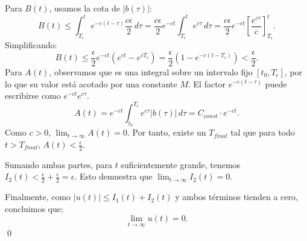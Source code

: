 {\begin{enumerate}
        Para $B(t)$, usamos la cota de $|b(\tau)|$:
        \[
        B(t) \leq \int_{T_\epsilon}^t e^{-c(t - \tau)} \frac{c\epsilon}{2} \, d\tau = \frac{c\epsilon}{2} e^{-ct} \int_{T_\epsilon}^t e^{c\tau} \, d\tau = \frac{c\epsilon}{2} e^{-ct} \left[ \frac{e^{c\tau}}{c} \right]_{T_\epsilon}^t.
        \]
        Simplificando:
        \[
        B(t) \leq \frac{\epsilon}{2} e^{-ct} (e^{ct} - e^{cT_\epsilon}) = \frac{\epsilon}{2} (1 - e^{-c(t - T_\epsilon)}) < \frac{\epsilon}{2}.
        \]
        Para $A(t)$, observamos que es una integral sobre un intervalo fijo $[t_0, T_\epsilon]$, por lo que su valor está acotado por una constante $M$. El factor $e^{-c(t-\tau)}$ puede escribirse como $e^{-ct}e^{c\tau}$.
        \[
        A(t) = e^{-ct} \int_{t_0}^{T_\epsilon} e^{c\tau} |b(\tau)| \, d\tau = C_{const} \cdot e^{-ct}.
        \]
        Como $c > 0$, $\lim_{t \to \infty} A(t) = 0$. Por tanto, existe un $T_{final}$ tal que para todo $t > T_{final}$, $A(t) < \frac{\epsilon}{2}$.
    
        Sumando ambas partes, para $t$ suficientemente grande, tenemos $I_2(t) < \frac{\epsilon}{2} + \frac{\epsilon}{2} = \epsilon$. Esto demuestra que $\lim_{t \to \infty} I_2(t) = 0$.
    \end{enumerate}

    Finalmente, como $|u(t)| \leq I_1(t) + I_2(t)$ y ambos términos tienden a cero, concluimos que:
    \[
    \lim_{t \to \infty} u(t) = 0.
    \]
    \qed
}


